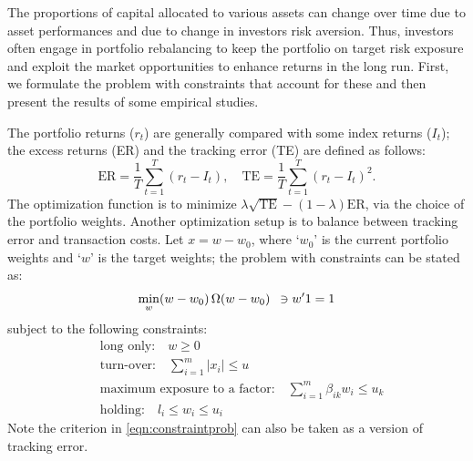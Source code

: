 The proportions of capital allocated to various assets can change over time due to asset performances and due to change in investors risk aversion. Thus, investors often engage in portfolio rebalancing to keep the portfolio on target risk exposure and exploit the market opportunities to enhance returns in the long run. First, we formulate the problem with constraints that account for these and then present the results of some empirical studies.


The portfolio returns ($r_t$) are generally compared with some index returns ($I_t$); the excess returns (ER) and the tracking error (TE) are defined as follows:
	\begin{equation} \label{eqn:excesstrack}
	\text{ER}= \dfrac{1}{T} \sum_{t=1}^T (r_t - I_t), \quad \text{TE}= \dfrac{1}{T} \sum_{t=1}^T (r_t - I_t)^2.
	\end{equation}
The optimization function is to minimize $\lambda \sqrt{\text{TE}} - (1 - \lambda) \text{ER}$, via the choice of the portfolio weights. Another optimization setup is to balance between tracking error and transaction costs. Let $x= w - w_0$, where `$w_0$' is the current portfolio weights and `$w$' is the target weights; the problem with constraints can be stated as:
	\begin{equation} \label{eqn:constraintprob}
	\min_w (w - w_0)\, \Omega (w-w_0) \enskip \ni w'1= 1
	\end{equation}
subject to the following constraints:
	\begin{equation} \label{eqn:constraintlist}
	\begin{split}
	&\text{long only:} \quad w \geq 0 \\
	&\text{turn-over:} \quad \sum_{i=1}^m |x_i| \leq u \\
	&\text{maximum exposure to a factor:} \quad \sum_{i=1}^m \beta_{ik} w_i \leq u_k \\
	&\text{holding:} \quad l_i \leq w_i \leq u_i
	\end{split}
	\end{equation}
Note the criterion in \eqref{eqn:constraintprob} can also be taken as a version of tracking error. 



